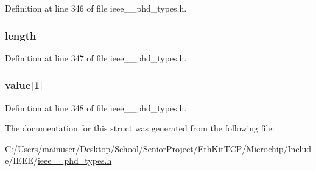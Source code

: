 Definition at line 346 of file ieee\+\_\+\_\+phd\+\_\+types.\+h.

\hypertarget{struct___segment_info_list_a3743679e4ff85e3e1b3fc2e59973fbb3}{}
\subsubsection[{length}]{ length}\label{struct___segment_info_list_a3743679e4ff85e3e1b3fc2e59973fbb3}


Definition at line 347 of file ieee\+\_\+\_\+phd\+\_\+types.\+h.

\hypertarget{struct___segment_info_list_ac2a01f3b46a4bfa439ae28dbbc0013d3}{}
\subsubsection[{value}]{ value\mbox{[}1\mbox{]}}\label{struct___segment_info_list_ac2a01f3b46a4bfa439ae28dbbc0013d3}


Definition at line 348 of file ieee\+\_\+\_\+phd\+\_\+types.\+h.



The documentation for this struct was generated from the following file\+:\begin{DoxyCompactItemize}
\item 
C\+:/\+Users/mainuser/\+Desktop/\+School/\+Senior\+Project/\+Eth\+Kit\+T\+C\+P/\+Microchip/\+Include/\+I\+E\+E\+E/\hyperlink{ieee__11073__phd__types_8h}{ieee\+\_\+\_\+phd\+\_\+types.\+h}\end{DoxyCompactItemize}
